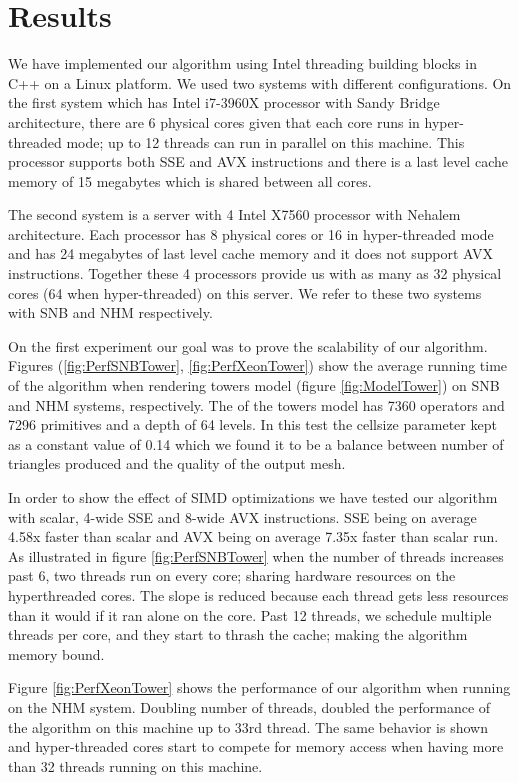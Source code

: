 \section{Results}\label{sec:results}
We have implemented our algorithm using Intel threading building blocks in C++ on a Linux platform. We used two systems with 
different configurations. On the first system which has Intel i7-3960X processor with Sandy Bridge architecture, there are 6 
physical cores given that each core runs in hyper-threaded mode; up to 12 threads can run in parallel on this machine. 
This processor supports both SSE and AVX instructions and there is a last level cache memory of 15 megabytes 
which is shared between all cores.

The second system is a server with 4 Intel X7560 processor with Nehalem architecture. Each processor has 8 physical cores
or 16 in hyper-threaded mode and has 24 megabytes of last level cache memory and it does not support AVX instructions. 
Together these 4 processors provide us with as many as 32 physical cores (64 when hyper-threaded) on this server. 
We refer to these two systems with SNB and NHM respectively.


On the first experiment our goal was to prove the scalability of our algorithm. Figures (\ref{fig:PerfSNBTower}, \ref{fig:PerfXeonTower}) 
show the average running time of the algorithm when rendering towers model (figure \ref{fig:ModelTower}) on SNB and NHM systems, 
respectively. The \blob of the towers model has 7360 operators and 7296 primitives and a depth of 64 levels. 
In this test the cellsize parameter kept as a constant value of 0.14 which we found it to be a balance between number of triangles produced and 
the quality of the output mesh.  

In order to show the effect of SIMD optimizations we have tested our algorithm with scalar, 4-wide SSE and 8-wide AVX instructions. 
SSE being on average 4.58x faster than scalar and AVX being on average 7.35x faster than scalar run. As illustrated in figure \ref{fig:PerfSNBTower}
when the number of threads increases past 6, two threads run on every core; sharing hardware resources on the hyperthreaded cores.  
The slope is reduced because each thread gets less resources than it would if it ran alone on the core.  Past 12 threads, we 
schedule multiple threads per core, and they start to thrash the cache; making the algorithm memory bound.

Figure \ref{fig:PerfXeonTower} shows the performance of our algorithm when running on the NHM system. Doubling number of 
threads, doubled the performance of the algorithm on this machine up to 33rd thread. The same behavior is shown and hyper-threaded 
cores start to compete for memory access when having more than 32 threads running on this machine.

